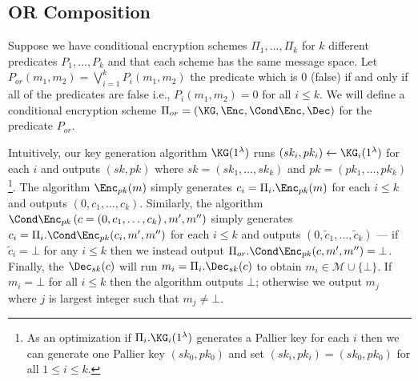


\subsection{OR Composition}
Suppose we have conditional encryption schemes $\Pi_1,\ldots, \Pi_k$ for $k$ different predicates $P_1,\ldots, P_k$ and that each scheme has the same message space. Let $P_{or}(m_1,m_2) = \bigvee_{i=1}^k P_i(m_1,m_2)$ the predicate which is $0$ (false) if and only if all of the predicates are false i.e., $P_i(m_1,m_2)=0$ for all $i \leq k$. We will define a conditional encryption scheme $\Pi_{or} = (\KG, \Enc,\Cond\Enc,\Dec)$ for the predicate $P_{or}$. 

Intuitively, our key generation algorithm $\KG(1^{\lambda})$ runs $(sk_i,pk_i) \gets \KG_i(1^\lambda)$ for each $i$ and outputs $(sk,pk)$ where $sk = (sk_1,\ldots, sk_k)$ and $pk = (pk_1,\ldots, pk_k)$\footnote{As an optimization if $\Pi_i.\KG_i(1^\lambda)$ generates a Pallier key for each $i$ then we can generate one Pallier key $(sk_0,pk_0)$ and set $(sk_i,pk_i)=(sk_0,pk_0)$ for all $1 \leq i \leq k$. }. The algorithm $\Enc_{pk}(m)$ simply generates $c_i = \Pi_i.\Enc_{pk}(m)$ for each $i\leq k$ and outputs $(0,c_1,\ldots, c_k)$. Similarly, the algorithm $\Cond\Enc_{pk}\left(c=\left(0,c_1,\ldots,c_k\right),m',m''\right)$ simply generates $c_i = \Pi_i.\Cond\Enc_{pk}(c_i,m',m'')$ for each $i\leq k$ and outputs $(0,\tilde{c}_1,\ldots, \tilde{c}_k)$ --- if $\tilde{c}_i = \bot$ for any $i \leq k$ then we instead output $\Pi_{or}.\Cond\Enc_{pk}(c,m',m'') = \bot$. Finally, the $\Dec_{sk}(c)$ will run $m_i = \Pi_i.\Dec_{sk}(c)$ to obtain $m_i \in \mathcal{M} \cup \{\bot\}$. If $m_i=\bot$ for all $i\leq k$ then the algorithm outputs $\bot$; otherwise we output $m_j$ where $j$ is largest integer such that $m_j \neq \bot$. 



